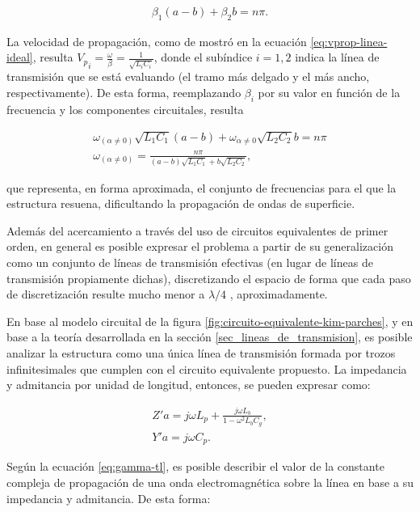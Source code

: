 \begin{align}
	\beta_1 (a-b) + \beta_2 b = n\pi .
\end{align}

La velocidad de propagación, como de mostró en la ecuación \ref{eq:vprop-linea-ideal}, resulta ${V_p}_i = \frac{\omega}{\beta} = \frac{1}{\sqrt{L_i C_i}}$, donde el subíndice $i=1,2$ indica la línea de transmisión que se está evaluando (el tramo más delgado y el más ancho, respectivamente). De esta forma, reemplazando $\beta_i$ por su valor en función de la frecuencia y los componentes circuitales, resulta

\begin{align}
	\omega_{(\alpha\neq 0)} \sqrt{L_1 C_1} (a-b) + \omega_{\alpha\neq 0} \sqrt{L_2 C_2} b = n\pi \\
	\omega_{(\alpha\neq 0)} = \frac{n\pi}{(a-b) \sqrt{L_1 C_1} + b \sqrt{L_2 C_2}},
\end{align}

que representa, en forma aproximada, el conjunto de frecuencias para el que la estructura resuena, dificultando la propagación de ondas de superficie.


Además del acercamiento a través del uso de circuitos equivalentes de primer orden, en general es posible expresar el problema a partir de su generalización como un conjunto de líneas de transmisión efectivas (en lugar de líneas de transmisión propiamente dichas), discretizando el espacio de forma que cada paso de discretización resulte mucho menor a $\lambda/4$ \cite{Caloz:ElectromagneticMetamaterials}, aproximadamente.

En base al modelo circuital de la figura \ref{fig:circuito-equivalente-kim-parches}, y en base a la teoría desarrollada en la sección \ref{sec_lineas_de_transmision}, es posible analizar la estructura como una única línea de transmisión formada por trozos infinitesimales que cumplen con el circuito equivalente propuesto. La impedancia y admitancia por unidad de longitud, entonces, se pueden expresar como:

\begin{align}
	Z' a = j\omega L_p + \frac{j\omega L_b}{1-\omega^2 L_b C_g}, \\
	Y' a = j\omega C_p.
\end{align}

Según la ecuación \ref{eq:gamma-tl}, es posible describir el valor de la constante compleja de propagación de una onda electromagnética sobre la línea en base a su impedancia y admitancia. De esta forma:

